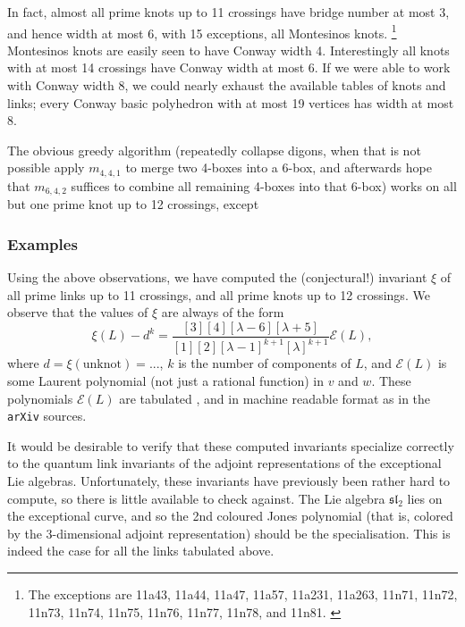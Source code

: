 \documentclass[12pt]{amsart}
\begin{document}
In fact, almost all prime knots up to 11 crossings have bridge number 
at most 3, and hence width at most 6, with 15 exceptions, all Montesinos
knots. \footnote{The exceptions are 11a43, 11a44, 11a47, 11a57, 11a231,
  11a263, 11n71, 11n72, 11n73, 11n74, 11n75, 11n76, 11n77, 11n78, and
  11n81. \cite{1208.4233}}
Montesinos knots are easily seen to have Conway width 4.
Interestingly all knots with at most 14 crossings have Conway width at most 6.
If we were able to work with Conway width 8, we could nearly exhaust the 
available tables of knots and links; every Conway basic polyhedron with at 
most 19 vertices has width at most 8.

The obvious greedy algorithm (repeatedly collapse digons, when that is not 
possible apply $m_{4,4,1}$ to merge two 4-boxes into a 6-box, and afterwards
hope that $m_{6,4,2}$  suffices to combine all remaining 4-boxes into that
6-box) works on all but one prime knot up to 12 crossings, except 

\subsubsection{Examples}
Using the above observations, we have computed the (conjectural!) 
invariant $\xi$ of all prime links up to 11 crossings, and all prime knots up
to 12 crossings. We observe that the values of $\xi$ are always of the form
$$\xi(L) - d^{k} = 
\frac{[3][4][\lambda-6][\lambda+5]}{[1][2][\lambda-1]^{k+1} [\lambda]^{k+1}} \mathcal E(L),$$
where $d = \xi(\textrm{unknot}) = ...$, $k$ is the number of components of $L$, 
and $\mathcal E(L)$ is some Laurent polynomial (not just a rational function)
in $v$ and $w$. These polynomials $\mathcal E (L)$ are tabulated
, and in machine readable format as  in the {\tt arXiv} sources.

It would be desirable to verify that these computed invariants specialize 
correctly to the quantum link invariants of the adjoint representations of the
exceptional Lie algebras.
Unfortunately, these invariants have previously been
rather hard to compute, so there is little available to check against. The Lie
algebra $\mathfrak{sl}_2$ lies on the exceptional curve, and so the 2nd
coloured Jones polynomial  (that is, colored by the 3-dimensional adjoint
representation) should be the  specialisation. This is
indeed the case for all the links tabulated above.
\end{document}
